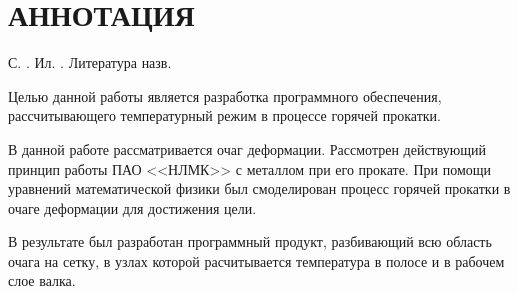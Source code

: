 \newpage
\pagestyle{plain}
\setcounter{page}{3}
\section*{АННОТАЦИЯ}

С. \totpage. Ил. \totfig. Литература  назв.

Целью данной работы является разработка программного обеспечения, рассчитывающего температурный режим в процессе горячей прокатки.

В данной работе рассматривается очаг деформации. Рассмотрен действующий принцип работы ПАО <<НЛМК>> с металлом при его прокате. При помощи уравнений математической физики был смоделирован процесс горячей прокатки в очаге деформации для достижения цели.

В результате был разработан программный продукт, разбивающий всю область очага на сетку, в узлах которой расчитывается температура в полосе и в рабочем слое валка.
